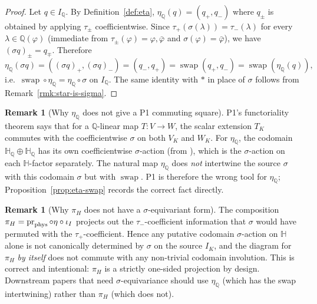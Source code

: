 \documentclass[11pt, a4paper]{amsart}
\theoremstyle{definition}
\newtheorem{remark}[theorem]{Remark}
\newcommand{\Q}{\mathbb{Q}}
\newcommand{\HH}{\mathbb{H}}
\begin{document}
\begin{proof}
Let $q \in I_\Q$. By Definition~\ref{def:eta},
$\eta_\Q(q) = (q_+, q_-)$ where $q_\pm$ is obtained by applying
$\tau_\pm$ coefficientwise. Since
$\tau_+(\sigma(\lambda)) = \tau_-(\lambda)$ for every $\lambda \in
\Q(\varphi)$ (immediate from $\tau_\pm(\varphi) =
\varphi, \bar\varphi$ and $\sigma(\varphi) = \bar\varphi$), we have
$(\sigma q)_\pm = q_\mp$. Therefore
\[
  \eta_\Q(\sigma q) = ((\sigma q)_+, (\sigma q)_-) = (q_-, q_+)
  = \operatorname{swap}(q_+, q_-) = \operatorname{swap}(\eta_\Q(q)),
\]
i.e.\ $\operatorname{swap} \circ \eta_\Q = \eta_\Q \circ \sigma$
on $I_\Q$. The same identity with $\ast$ in place of $\sigma$
follows from Remark~\ref{rmk:star-is-sigma}.
\end{proof}

\begin{remark}[Why $\eta_\Q$ does not give a P1 commuting square]
\label{rmk:eta-not-P1}
P1's functoriality theorem
\cite[Thm.~4.5]{SigmaRationality} says that for a $\Q$-linear
map $T \colon V \to W$, the scalar extension $T_K$ commutes with
the coefficientwise $\sigma$ on both $V_K$ and $W_K$. For
$\eta_\Q$, the codomain $\HH_\Q \oplus \HH_\Q$ has its own
coefficientwise $\sigma$-action (from
\cite[Def.~2.5]{SigmaRationality}), which is the
$\sigma$-action on each $\HH$-factor separately. The natural map
$\eta_\Q$ does \emph{not} intertwine the source $\sigma$ with this
codomain $\sigma$ but with $\operatorname{swap}$. P1 is therefore
the wrong tool for $\eta_\Q$; Proposition~\ref{prop:eta-swap}
records the correct fact directly.
\end{remark}


\begin{remark}[Why $\pi_H$ does not have a $\sigma$-equivariant
form]
\label{rmk:pi-H-no-sigma}
The composition $\pi_H = \operatorname{pr}_{\rm phys} \circ \eta
\circ \iota_I$ projects out the $\tau_-$-coefficient information
that $\sigma$ would have permuted with the $\tau_+$-coefficient.
Hence any putative codomain $\sigma$-action on $\HH$ alone is
not canonically determined by $\sigma$ on the source $I_K$, and
the diagram for $\pi_H$ \emph{by itself} does not commute with any
non-trivial codomain involution. This is correct and intentional:
$\pi_H$ is a strictly one-sided projection by design. Downstream
papers that need $\sigma$-equivariance should use
$\eta_\Q$ (which has the swap intertwining) rather than $\pi_H$
(which does not).
\end{remark}

\end{document}

